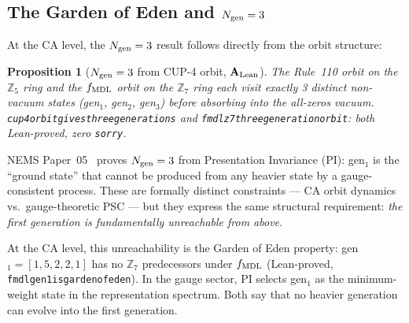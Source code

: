 \documentclass[11pt]{article}
\newtheorem{proposition}[theorem]{Proposition}
\theoremstyle{remark}
\newcommand{\lean}[1]{%
  \penalty-100
  \begingroup\def\_{\textunderscore\allowbreak}\texttt{#1}\endgroup}
\newcommand{\CatAL}{\ensuremath{\textbf{A}_{\rm Lean}}}
\begin{document}
\subsection{The Garden of Eden and \texorpdfstring{$N_{\rm gen}=3$}{Ngen=3}}
\label{sec:goe_ngen}

At the CA level, the $N_{\rm gen}=3$ result follows directly from the orbit structure:

\begin{proposition}[$N_{\rm gen} = 3$ from CUP-4 orbit, $\CatAL$]
\label{prop:ngen3}
The Rule~110 orbit on the $\mathbb{Z}_5$ ring and the $f_{\rm MDL}$ orbit on the
$\mathbb{Z}_7$ ring each visit exactly 3 distinct non-vacuum states (gen$_1$, gen$_2$,
gen$_3$) before absorbing into the all-zeros vacuum.
\lean{cup4\_orbit\_gives\_three\_generations} and \lean{fmdl\_z7\_three\_generation\_orbit}:
both Lean-proved, zero \texttt{sorry}.
\end{proposition}

NEMS Paper~05~\cite{SpivackUGP2024} proves $N_{\rm gen} = 3$ from Presentation
Invariance (PI): gen$_1$ is the ``ground state'' that cannot be produced from any
heavier state by a gauge-consistent process. These are formally distinct constraints
--- CA orbit dynamics vs.\ gauge-theoretic PSC --- but they express the same structural
requirement: \emph{the first generation is fundamentally unreachable from above}.

At the CA level, this unreachability is the Garden of Eden property: gen$_1 =
[1,5,2,2,1]$ has no $\mathbb{Z}_7$ predecessors under $f_{\rm MDL}$ (Lean-proved,
\lean{fmdl\_gen1\_is\_garden\_of\_eden}). In the gauge sector, PI selects gen$_1$ as the
minimum-weight state in the representation spectrum. Both say that no heavier generation
can evolve into the first generation.
\end{document}
